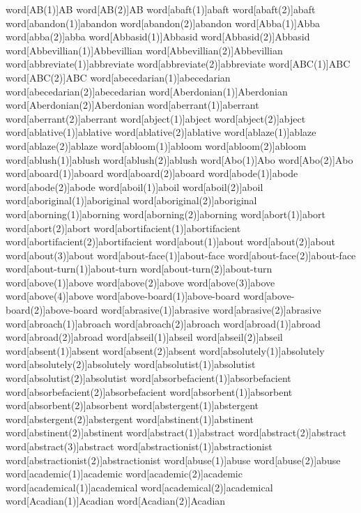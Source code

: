 word[AB(1)]{AB}
word[AB(2)]{AB}
word[abaft(1)]{abaft}
word[abaft(2)]{abaft}
word[abandon(1)]{abandon}
word[abandon(2)]{abandon}
word[Abba(1)]{Abba}
word[abba(2)]{abba}
word[Abbasid(1)]{Abbasid}
word[Abbasid(2)]{Abbasid}
word[Abbevillian(1)]{Abbevillian}
word[Abbevillian(2)]{Abbevillian}
word[abbreviate(1)]{abbreviate}
word[abbreviate(2)]{abbreviate}
word[ABC(1)]{ABC}
word[ABC(2)]{ABC}
word[abecedarian(1)]{abecedarian}
word[abecedarian(2)]{abecedarian}
word[Aberdonian(1)]{Aberdonian}
word[Aberdonian(2)]{Aberdonian}
word[aberrant(1)]{aberrant}
word[aberrant(2)]{aberrant}
word[abject(1)]{abject}
word[abject(2)]{abject}
word[ablative(1)]{ablative}
word[ablative(2)]{ablative}
word[ablaze(1)]{ablaze}
word[ablaze(2)]{ablaze}
word[abloom(1)]{abloom}
word[abloom(2)]{abloom}
word[ablush(1)]{ablush}
word[ablush(2)]{ablush}
word[Abo(1)]{Abo}
word[Abo(2)]{Abo}
word[aboard(1)]{aboard}
word[aboard(2)]{aboard}
word[abode(1)]{abode}
word[abode(2)]{abode}
word[aboil(1)]{aboil}
word[aboil(2)]{aboil}
word[aboriginal(1)]{aboriginal}
word[aboriginal(2)]{aboriginal}
word[aborning(1)]{aborning}
word[aborning(2)]{aborning}
word[abort(1)]{abort}
word[abort(2)]{abort}
word[abortifacient(1)]{abortifacient}
word[abortifacient(2)]{abortifacient}
word[about(1)]{about}
word[about(2)]{about}
word[about(3)]{about}
word[about-face(1)]{about-face}
word[about-face(2)]{about-face}
word[about-turn(1)]{about-turn}
word[about-turn(2)]{about-turn}
word[above(1)]{above}
word[above(2)]{above}
word[above(3)]{above}
word[above(4)]{above}
word[above-board(1)]{above-board}
word[above-board(2)]{above-board}
word[abrasive(1)]{abrasive}
word[abrasive(2)]{abrasive}
word[abroach(1)]{abroach}
word[abroach(2)]{abroach}
word[abroad(1)]{abroad}
word[abroad(2)]{abroad}
word[abseil(1)]{abseil}
word[abseil(2)]{abseil}
word[absent(1)]{absent}
word[absent(2)]{absent}
word[absolutely(1)]{absolutely}
word[absolutely(2)]{absolutely}
word[absolutist(1)]{absolutist}
word[absolutist(2)]{absolutist}
word[absorbefacient(1)]{absorbefacient}
word[absorbefacient(2)]{absorbefacient}
word[absorbent(1)]{absorbent}
word[absorbent(2)]{absorbent}
word[abstergent(1)]{abstergent}
word[abstergent(2)]{abstergent}
word[abstinent(1)]{abstinent}
word[abstinent(2)]{abstinent}
word[abstract(1)]{abstract}
word[abstract(2)]{abstract}
word[abstract(3)]{abstract}
word[abstractionist(1)]{abstractionist}
word[abstractionist(2)]{abstractionist}
word[abuse(1)]{abuse}
word[abuse(2)]{abuse}
word[academic(1)]{academic}
word[academic(2)]{academic}
word[academical(1)]{academical}
word[academical(2)]{academical}
word[Acadian(1)]{Acadian}
word[Acadian(2)]{Acadian}
